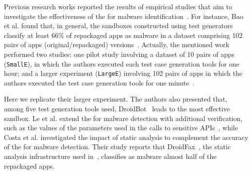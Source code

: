 






Previous research works reported the results of empirical studies that aim to investigate the effectiveness of
the \mas for malware identification~\cite{DBLP:conf/wcre/BaoLL18,DBLP:conf/scam/CostaMCMVBC20}.
For instance, Bao et al. found that, in general, the sandboxes constructed using test generators classify at least 66\% of repackaged apps as malware in a dataset comprising 102 pairs of apps (original/repackaged) versions~\cite{DBLP:conf/wcre/BaoLL18}.
Actually, the mentioned work performed two studies: one pilot study involving a dataset
of 10 pairs of apps (\texttt{SmallE}), in which the authors executed each test case generation tools for one hour; and a larger experiment
(\texttt{LargeE}) involving 102 pairs of
apps in which the authors executed the test case generation tools for one minute~\cite{DBLP:conf/wcre/BaoLL18}.

Here we replicate their larger experiment. 
The authors also presented that, among five test generation tools used, DroidBot~\cite{DBLP:conf/icse/LiYGC17} leads to the most effective sandbox.
Le et al. extend the \mas for malware detection with additional verification,
such as the values of the parameters used in the
calls to sensitive APIs~\cite{le2018towards}, while
Costa et al.\cite{DBLP:journals/jss/CostaMMSSBNR22} investigated the impact of static analysis to complement the accuracy of the \mas
for malware detection. Their study reports that DroidFax~\cite{DBLP:conf/icsm/CaiR17a}, the static analysis infrastructure used in~\cite{DBLP:conf/wcre/BaoLL18}, classifies as malware almost half of the repackaged apps.

